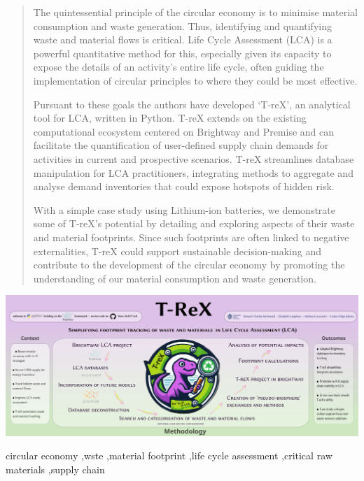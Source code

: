 \documentclass[a4paper,fleqn]{cas-dc}
\begin{document}
\begin{abstract}
The quintessential principle of the circular economy is to minimise material consumption and waste generation.
Thus, identifying and quantifying waste and material flows is critical.
 Life Cycle Assessment (LCA) is a powerful quantitative method for this,
especially given its capacity to expose the details of an activity's entire life cycle, 
often guiding the implementation of circular principles to where they could be most effective.

Pursuant to these goals the authors have developed `T-reX', an analytical tool
for LCA, written in Python. T-reX extends on the existing computational
ecosystem centered on Brightway and Premise and can facilitate the
quantification of user-defined supply chain demands for activities in current
and prospective scenarios. T-reX streamlines database manipulation for LCA
practitioners, integrating methods to aggregate and analyse demand inventories
that could expose hotspots of hidden risk.

With a simple case study using Lithium-ion batteries, we demonstrate some of
T-reX's potential by detailing and exploring aspects of their waste and
material footprints. Since such footprints are often linked to negative
externalities, T-reX could support sustainable decision-making and contribute
to the development of the circular economy by promoting the understanding of
our material consumption and waste generation.
\end{abstract}


\begin{graphicalabstract}
	\includegraphics[width=\textwidth]{figures/T-reX_graphical-abstract.pdf}
\end{graphicalabstract}

\begin{keyword}
circular economy \sep wste \sep material footprint \sep life cycle assessment \sep critical raw materials \sep supply chain
\end{keyword}
\end{document}
